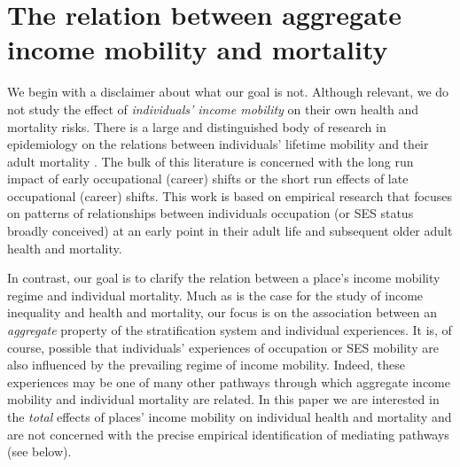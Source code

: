 \documentclass[11pt]{article}
\begin{document}


\section{The relation between aggregate income mobility and mortality}

We begin with a disclaimer about what our goal is not. Although relevant, we do not study the effect of \textit{individuals' income mobility} on their own health and mortality risks. There is a large and distinguished body of research in epidemiology on the relations between individuals' lifetime mobility and their adult mortality \citep{Chandola2003, Illsley1955, Fox1982, Blane1999, Blane1993}. The bulk of this literature is concerned with the long run impact of early occupational (career) shifts or the short run effects of late occupational (career) shifts. This work is based on empirical research that focuses on patterns of relationships between individuals occupation (or SES status broadly conceived) at an early point in their adult life and subsequent older adult health and mortality. 

In contrast, our goal is to clarify the relation between a place's income mobility regime and individual mortality. Much as is the case for the study of income inequality and health and mortality, our focus is on the association between an \textit{aggregate} property of the stratification system and individual experiences. It is, of course, possible that individuals' experiences of occupation or SES mobility are also influenced by the prevailing regime of income mobility. Indeed, these experiences may be one of many other pathways through which aggregate income mobility and individual mortality are related. In this paper we are interested in the \textit{total} effects of places' income mobility on individual health and mortality and are not concerned with the precise empirical identification of mediating pathways (see below).
\end{document}
